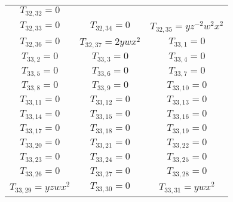 \documentclass[12pt]{memoireuqam1.3}
\begin{document}
\begin{longtable}{|c|c|c|}
$T_{32,32}= 0$\\

$T_{32,33}= 0$&

$T_{32,34}= 0$&

$T_{32,35}= yz^{-2}w^2x^2$\\

$T_{32,36}= 0$&

$T_{32,37}= 2ywx^2$&

$T_{33,1}= 0$\\

$T_{33,2}= 0$&

$T_{33,3}= 0$&

$T_{33,4}= 0$\\

$T_{33,5}= 0$&

$T_{33,6}= 0$&

$T_{33,7}= 0$\\

$T_{33,8}= 0$&

$T_{33,9}= 0$&

$T_{33,10}= 0$\\

$T_{33,11}= 0$&

$T_{33,12}= 0$&

$T_{33,13}= 0$\\

$T_{33,14}= 0$&

$T_{33,15}= 0$&

$T_{33,16}= 0$\\

$T_{33,17}= 0$&

$T_{33,18}= 0$&

$T_{33,19}= 0$\\

$T_{33,20}= 0$&

$T_{33,21}= 0$&

$T_{33,22}= 0$\\

$T_{33,23}= 0$&

$T_{33,24}= 0$&

$T_{33,25}= 0$\\

$T_{33,26}= 0$&

$T_{33,27}= 0$&

$T_{33,28}= 0$\\

$T_{33,29}= yzwx^2$&

$T_{33,30}= 0$&

$T_{33,31}= ywx^2$\\


\end{longtable}
\end{document}
